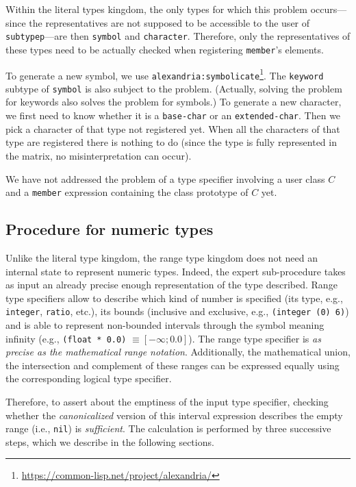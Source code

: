 \documentclass[format=sigconf]{acmart}
\newcommand\code[2][\small]{\sloppy\texttt{#1#2}}
\theoremstyle{definition}
\begin{document}
Within the literal types kingdom, the only types for which this problem
occurs---since the representatives are not supposed to be accessible to the user
of \code{subtypep}---are then \code{symbol} and \code{character}.
Therefore, only the representatives of these types need to be actually checked
when registering \code{member}'s elements.

To generate a new symbol, we use \code{alexandria:symbolicate}\footnote{%
  \url{https://common-lisp.net/project/alexandria/}
}.
The \code{keyword} subtype of \code{symbol} is also subject to the problem.
(Actually, solving the problem for keywords also solves the problem for
symbols.)
To generate a new character, we first need to know whether it is a
\code{base-char} or an \code{extended-char}. Then we pick a character of that
type not registered yet. When all the characters of that type are registered
there is nothing to do (since the type is fully represented in the matrix, no
misinterpretation can occur).

We have not addressed the problem of a type
specifier involving a user class $C$ and a \code{member} expression containing
the class prototype of $C$ yet.

\subsection{Procedure for numeric types}
\label{sec:expnum}
Unlike the literal type kingdom, the range type kingdom does not need an
internal state to represent numeric types. Indeed, the expert sub-procedure
takes as input an already precise enough representation of the type described.
Range type specifiers allow to describe which kind of number is specified (its
type, e.g., \code{integer}, \code{ratio}, etc.), its bounds (inclusive and
exclusive, e.g., \code{(integer (0) 6)}) and is able to represent non-bounded
intervals through the symbol \code{*} meaning infinity (e.g., \code{(float *
  0.0)} $\equiv \left[-\infty; 0.0\right]$). The range type specifier is
\emph{as precise as the mathematical range notation}. Additionally, the
mathematical union, the intersection and complement of these ranges can
be expressed equally using the corresponding logical type specifier.

Therefore, to assert about the emptiness of the input type specifier, checking
whether the \emph{canonicalized} version of this interval expression describes
the empty range (i.e., \code{nil}) is \emph{sufficient}.
The calculation is performed by three successive steps, which we describe in the
following sections.
\end{document}
